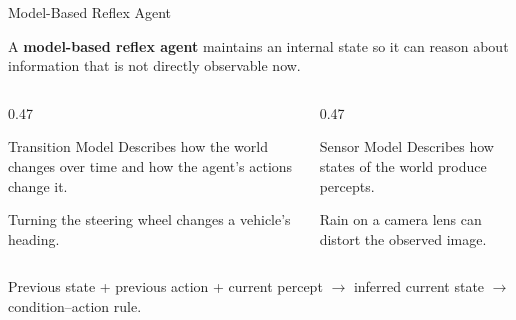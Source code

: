 \documentclass[aspectratio=169,10pt]{beamer}
\begin{document}
\begin{frame}[shrink=25]{Model-Based Reflex Agent}
  \begin{cpdefinition}
    A \textbf{model-based reflex agent} maintains an internal state so it can reason about information that is not directly observable now.
  \end{cpdefinition}
  \vspace{0.08in}
  \begin{columns}[T,onlytextwidth]
    \begin{column}{0.47\textwidth}
      \begin{block}{Transition Model}
        Describes how the world changes over time and how the agent's actions change it.
      \end{block}
      \begin{exampleblockcp}
        Turning the steering wheel changes a vehicle's heading.
      \end{exampleblockcp}
    \end{column}
    \begin{column}{0.47\textwidth}
      \begin{block}{Sensor Model}
        Describes how states of the world produce percepts.
      \end{block}
      \begin{exampleblockcp}
        Rain on a camera lens can distort the observed image.
      \end{exampleblockcp}
    \end{column}
  \end{columns}
  \vspace{0.08in}
  \begin{keyidea}
    Previous state + previous action + current percept $\rightarrow$ inferred current state $\rightarrow$ condition--action rule.
  \end{keyidea}
\end{frame}
\end{document}
